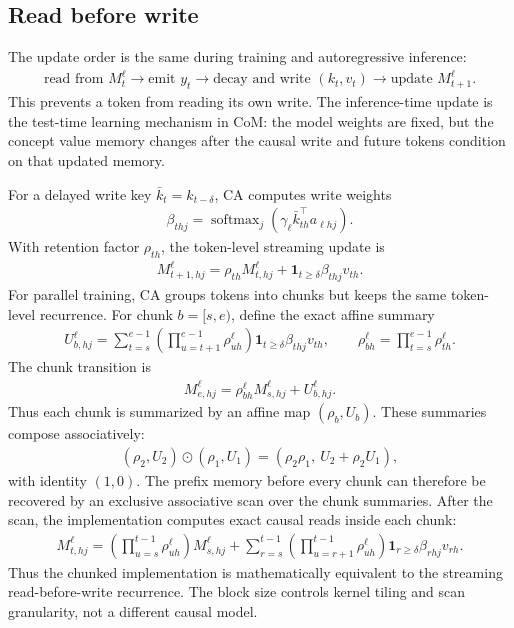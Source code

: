 \subsection{Read before write}

The update order is the same during training and autoregressive inference:
\begin{align*}
\text{read from }M_t^\ell
\rightarrow
\text{emit }y_t
\rightarrow
\text{decay and write }(k_t,v_t)
\rightarrow
\text{update }M_{t+1}^\ell .
\end{align*}
This prevents a token from reading its own write. The inference-time update is the test-time learning mechanism in CoM: the model weights are fixed, but the concept value memory changes after the causal write and future tokens condition on that updated memory.

For a delayed write key $\bar k_t=k_{t-\delta}$, CA computes write weights
\begin{align*}
\beta_{thj}
=
\operatorname{softmax}_{j}
\left(\gamma_\ell \bar k_{th}^\top a_{\ell hj}\right).
\end{align*}
With retention factor $\rho_{th}$, the token-level streaming update is
\begin{align*}
M_{t+1,hj}^{\ell}
=
\rho_{th}M_{t,hj}^{\ell}
+\mathbf{1}_{t\ge\delta}\beta_{thj}v_{th}.
\end{align*}
For parallel training, CA groups tokens into chunks but keeps the same token-level recurrence. For chunk $b=[s,e)$, define the exact affine summary
\begin{align*}
U_{b,hj}^{\ell}
=
\sum_{t=s}^{e-1}
\left(\prod_{u=t+1}^{e-1}\rho_{uh}^{\ell}\right)
\mathbf{1}_{t\ge \delta}
\beta_{thj}v_{th},
\qquad
\rho_{bh}^{\ell}
=
\prod_{t=s}^{e-1}\rho_{th}^{\ell}.
\end{align*}
The chunk transition is
\begin{align*}
M_{e,hj}^{\ell}
=
\rho_{bh}^{\ell}M_{s,hj}^{\ell}
+U_{b,hj}^{\ell}.
\end{align*}
Thus each chunk is summarized by an affine map $(\rho_b,U_b)$. These summaries compose associatively:
\begin{align*}
(\rho_2,U_2)\odot(\rho_1,U_1)
=
(\rho_2\rho_1,\ U_2+\rho_2U_1),
\end{align*}
with identity $(1,0)$. The prefix memory before every chunk can therefore be recovered by an exclusive associative scan over the chunk summaries. After the scan, the implementation computes exact causal reads inside each chunk:
\begin{align*}
M_{t,hj}^{\ell}
=
\left(\prod_{u=s}^{t-1}\rho_{uh}^{\ell}\right)M_{s,hj}^{\ell}
+
\sum_{r=s}^{t-1}
\left(\prod_{u=r+1}^{t-1}\rho_{uh}^{\ell}\right)
\mathbf{1}_{r\ge\delta}\beta_{rhj}v_{rh}.
\end{align*}
Thus the chunked implementation is mathematically equivalent to the streaming read-before-write recurrence. The block size controls kernel tiling and scan granularity, not a different causal model.

